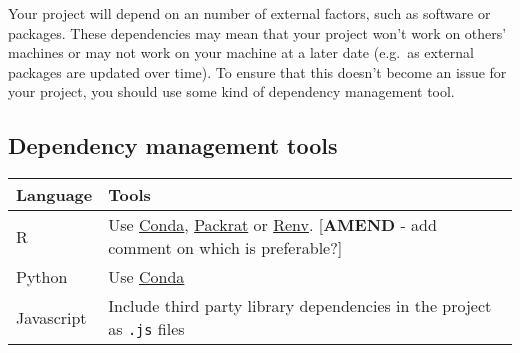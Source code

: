 \documentclass[]{book}
\begin{document}
Your project will depend on an number of external factors, such as software or packages. These dependencies may mean that your project won't work on others' machines or may not work on your machine at a later date (e.g.~as external packages are updated over time). To ensure that this doesn't become an issue for your project, you should use some kind of dependency management tool.

\hypertarget{dependency-management-tools}{%
\subsection*{Dependency management tools}\label{dependency-management-tools}}

\begin{longtable}[]{@{}ll@{}}
\toprule
\begin{minipage}[b]{0.20\columnwidth}\raggedright
Language\strut
\end{minipage} & \begin{minipage}[b]{0.74\columnwidth}\raggedright
Tools\strut
\end{minipage}\tabularnewline
\midrule
\endhead
\begin{minipage}[t]{0.20\columnwidth}\raggedright
R\strut
\end{minipage} & \begin{minipage}[t]{0.74\columnwidth}\raggedright
Use \href{https://github.com/moj-analytical-services/coffee-and-coding-public/blob/master/2019-10-30\%20Conda/conda.pdf}{Conda}, \href{https://rstudio.github.io/packrat/}{Packrat} or \href{https://blog.rstudio.com/2019/11/06/renv-project-environments-for-r/}{Renv}. {[}\textbf{AMEND} - add comment on which is preferable?{]}\strut
\end{minipage}\tabularnewline
\begin{minipage}[t]{0.20\columnwidth}\raggedright
Python\strut
\end{minipage} & \begin{minipage}[t]{0.74\columnwidth}\raggedright
Use \href{https://github.com/moj-analytical-services/coffee-and-coding-public/blob/master/2019-10-30\%20Conda/conda.pdf}{Conda}\strut
\end{minipage}\tabularnewline
\begin{minipage}[t]{0.20\columnwidth}\raggedright
Javascript\strut
\end{minipage} & \begin{minipage}[t]{0.74\columnwidth}\raggedright
Include third party library dependencies in the project as \texttt{.js} files\strut
\end{minipage}\tabularnewline
\bottomrule
\end{longtable}
\end{document}
